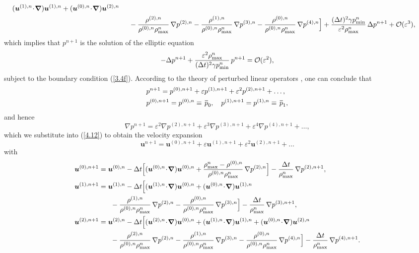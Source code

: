 \documentclass[A4paper,12pt,twoside]{article}
\newenvironment{proof}{{\flushleft \bf Proof:}}{}
\numberwithin{equation}{section}
\numberwithin{figure}{section}
\numberwithin{table}{section}
\def\bnabla{\bm{\nabla}}
\newcommand{\dt}{\Delta t}
\newcommand{\ve}{\varepsilon}
\newcommand\eref[1]{(\ref{#1})}
\newcommand*\xbar[1]{%
  \hbox{%
    \vbox{%
      \hrule height 0.5pt %
      \kern0.4ex%
      \hbox{%
        \kern-0.05em%
        \ensuremath{#1}%
        \kern-0.00em%
      }%
    }%
  }%
}
\begin{document}
\begin{proof}
$$\begin{aligned}
(\bm u^{(1),n}\!\cdot\!\bnabla)\bm u^{(1),n}+(\bm u^{(0),n}\!\cdot\!\bnabla)\bm u^{(2),n}\\
&\hspace*{0.5cm}-\frac{\rho^{(2),n}}{\rho^{(0),n}\rho_{\max}^n}\,\nabla p^{(2),n}-
\frac{\rho^{(1),n}}{\rho^{(0),n}\rho_{\max}^n}\,\nabla p^{(3),n}-\frac{\rho^{(0),n}}{\rho^{(0),n}\rho_{\max}^n}\,\nabla p^{(4),n}\Big]
+\frac{(\dt)^2\gamma p_{\min}^n}{\ve^2 \rho_{\max}^n}\,\Delta p^{n+1}+{\cal O}(\ve^3),
\end{aligned}
$$
which implies that $p^{n+1}$ is the solution of the elliptic equation
$$
-\Delta p^{n+1}+\frac{\ve^2\rho_{\max}^n}{(\dt)^2\gamma p_{\min}^n}\,p^{n+1}={\cal O}(\ve^2),
$$
subject to the boundary condition \eref{3.4f}. According to the theory of perturbed linear operators \cite{kato1966perturbation}, one can
conclude that 
\begin{align}
&p^{n+1}=p^{(0),n+1}+\ve p^{(1),n+1}+\ve^2p^{(2),n+1}+\dots,\label{3.20f}\\
&p^{(0),n+1}=p^{(0),n}\equiv\,\xbar p_0,\quad p^{(1),n+1}=p^{(1),n}\equiv\,\xbar p_1,\label{4.14}
\end{align}
and hence
$$
\nabla p^{n+1}=\ve^2\nabla p^{(2),n+1}+\ve^3\nabla p^{(3),n+1}+\ve^4\nabla p^{(4),n+1}+\dots,
$$
which we substitute into \eref{4.12} to obtain the velocity expansion
$$
\bm u^{n+1}=\bm u^{(0),n+1}+\ve\bm u^{(1),n+1}+\ve^2\bm u^{(2),n+1}+\dots
$$
with
\begin{equation}
\begin{aligned}
\bm u^{(0),n+1}&=\bm u^{(0),n}-\dt\Big[(\bm u^{(0),n}\!\cdot\!\bnabla)\bm u^{(0),n}+
\frac{\rho_{\max}^n-\rho^{(0),n}}{\rho^{(0),n}\rho_{\max}^n}\,\nabla p^{(2),n}\Big]-\frac{\dt}{\rho_{\max}^n}\,\nabla p^{(2),n+1},\\
\bm u^{(1),n+1}&=\bm u^{(1),n}-\dt\Big[(\bm u^{(1),n}\!\cdot\!\bnabla)\bm u^{(0),n}+(\bm u^{(0),n}\!\cdot\!\bnabla)\bm u^{(1),n}\\
&\hspace*{0.6cm}-\frac{\rho^{(1),n}}{\rho^{(0),n}\rho_{\max}^n}\,\nabla p^{(2),n}-
\frac{\rho^{(0),n}}{\rho^{(0),n}\rho_{\max}^n}\,\nabla p^{(3),n}\Big]-\frac{\dt}{\rho_{\max}^n}\,\nabla p^{(3),n+1},\\
\bm u^{(2),n+1}&=\bm u^{(2),n}-\dt\Big[(\bm u^{(2),n}\!\cdot\!\bnabla)\bm u^{(0),n}+(\bm u^{(1),n}\!\cdot\!\bnabla)\bm u^{(1),n}
+(\bm u^{(0),n}\!\cdot\!\bnabla)\bm u^{(2),n}\\
&\hspace*{0.6cm}-\frac{\rho^{(2),n}}{\rho^{(0),n}\rho_{\max}^n}\,\nabla p^{(2),n}
-\frac{\rho^{(1),n}}{\rho^{(0),n}\rho_{\max}^n}\,\nabla p^{(3),n}-\frac{\rho^{(0),n}}{\rho^{(0),n}\rho_{\max}^n}\,\nabla p^{(4),n}\Big]-
\frac{\dt}{\rho_{\max}^n}\,\nabla p^{(4),n+1}.
\end{aligned}
\label{3.22}
\end{equation}


\end{proof}
\end{document}
